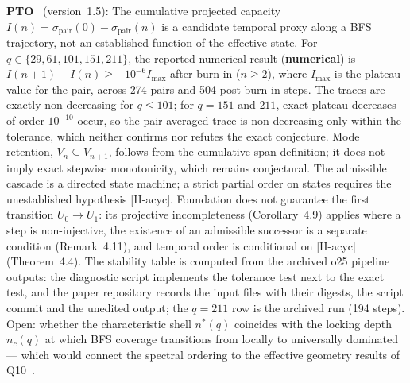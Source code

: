 \documentclass[11pt,a4paper]{article}
\newcommand{\snum}{\textcolor{cnum}{\textbf{numerical}}}
\begin{document}
    \textbf{PTO}~\cite{Beau2026pto} (version~1.5): The cumulative projected capacity
    $I(n) = \sigma_{\mathrm{pair}}(0) - \sigma_{\mathrm{pair}}(n)$ is a candidate temporal proxy
    along a BFS trajectory, not an established function of the effective state.
    For $q \in \{29, 61, 101, 151, 211\}$, the reported numerical result (\snum) is
    $I(n+1)-I(n) \geq -10^{-6}I_{\max}$ after burn-in ($n \geq 2$), where $I_{\max}$
    is the plateau value for the pair, across 274 pairs and 504 post-burn-in steps.
    The traces are exactly non-decreasing for $q \leq 101$; for $q = 151$ and $211$, exact plateau
    decreases of order $10^{-10}$ occur, so the pair-averaged trace is non-decreasing only within the
    tolerance, which neither confirms nor refutes the exact conjecture.
    Mode retention, $V_n \subseteq V_{n+1}$, follows from the cumulative span definition;
    it does not imply exact stepwise monotonicity, which remains conjectural.
    The admissible cascade is a directed state machine; a strict partial order on states requires
    the unestablished hypothesis [H-acyc].
    Foundation does not guarantee the first transition $U_0 \to U_1$: its projective incompleteness
    (Corollary~4.9) applies where a step is non-injective, the existence of an admissible successor is a
    separate condition (Remark~4.11), and temporal order is conditional on [H-acyc] (Theorem~4.4).
    The stability table is computed from the archived o25 pipeline outputs: the diagnostic script
    implements the tolerance test next to the exact test, and the paper repository records the input
    files with their digests, the script commit and the unedited output; the $q = 211$ row is the
    archived run (194 steps).
    Open: whether the characteristic shell $n^*(q)$ coincides with the locking depth $n_c(q)$
    at which BFS coverage transitions from locally to universally dominated — which would connect
    the spectral ordering to the effective geometry results of Q10~\cite{Beau2026q10}.
\end{document}
